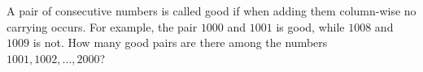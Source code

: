 A pair of consecutive numbers is called good if when adding them column-wise no carrying occurs. For example, the pair $1000$ and $1001$ is good, while $1008$ and $1009$ is not. How many good pairs are there among the numbers $1001, 1002, \ldots, 2000$?
